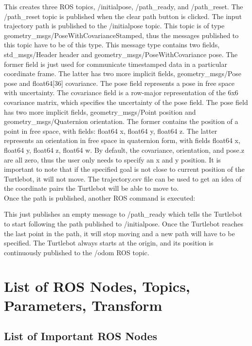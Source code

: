\documentclass[12]{article}
\begin{document}
This creates three ROS topics, /initialpose, /path\_ready, and /path\_reset. 
The /path\_reset topic is published when the clear path button is clicked. 
The input trajectory path is published to the /initialpose topic. 
This topic is of type geometry\_msgs/PoseWithCovarianceStamped, 
thus the messages published to this topic have to be of this type. 
This message type contains two fields, std\_msgs/Header header and geometry\_msgs/PoseWithCovariance pose. 
The former field is just used for communicate timestamped data in a particular coordinate frame. 
The latter has two more implicit fields, geometry\_msgs/Pose pose and float64[36] covariance. 
The pose field represents a pose in free space with uncertainty. 
The covariance field is a row-major representation of the 6x6 covariance matrix, which specifies the uncertainty of the pose field. 
The pose field has two more implicit fields, geometry\_msgs/Point position and geometry\_msgs/Quaternion orientation. 
The former contains the position of a point in free space, with fields: float64 x, float64 y, float64 z. 
The latter represents an orientation in free space in quaternion form, with fields float64 x, float64 y, float64 z, float64 w. 
By default, the covariance, orientation, and pose.z are all zero, thus the user only needs to specify an x and y position. 
It is important to note that if the specified goal is not close to current position of the Turtlebot, it will not move. 
The trajectory.csv file can be used to get an idea of the coordinate pairs the Turtlebot will be able to move to.\\

Once the path is published, another ROS command is executed:

This just publishes an empty message to /path\_ready which tells the Turtlebot to start following the path published to /initialpose. Once the Turtlebot reaches the last point in the path, it will stop moving and a new path will have to be specified. The Turtlebot always starts at the origin, and its position is continuously published to the /odom ROS topic. 

\newpage
\section{List of ROS Nodes, Topics, Parameters, Transform}
\subsection{List of Important ROS Nodes}
\end{document}
